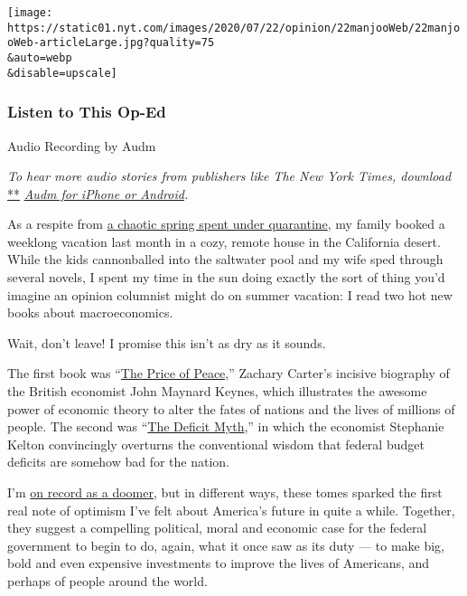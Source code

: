 \texttt{[image: https://static01.nyt.com/images/2020/07/22/opinion/22manjooWeb/22manjooWeb-articleLarge.jpg?quality=75\\\&auto=webp\\\&disable=upscale]}

\hypertarget{listen-to-this-op-ed}{%
\subsubsection{Listen to This Op-Ed}\label{listen-to-this-op-ed}}

Audio Recording by Audm

\emph{To hear more audio stories from publishers like The New York
Times, download}
\href{https://www.audm.com/?utm_source=nytmag\&utm_medium=embed\&utm_campaign=left_behind_draper}{**}
\href{https://www.audm.com/?utm_source=nytopinion\&utm_medium=embed\&utm_campaign=fix_america_spend}{\emph{Audm
for iPhone or Android}}\emph{.}

As a respite from
\href{https://www.nytimes.com/2020/04/22/opinion/coronavirus-parenting-burnout.html}{a
chaotic spring spent under quarantine}, my family booked a weeklong
vacation last month in a cozy, remote house in the California desert.
While the kids cannonballed into the saltwater pool and my wife sped
through several novels, I spent my time in the sun doing exactly the
sort of thing you'd imagine an opinion columnist might do on summer
vacation: I read two hot new books about macroeconomics.

Wait, don't leave! I promise this isn't as dry as it sounds.

The first book was
``\href{https://www.nytimes.com/2020/05/20/books/review-price-of-peace-john-maynard-keynes-zachary-carter.html?auth=login-email\&login=email}{The
Price of Peace,}'' Zachary Carter's incisive biography of the British
economist John Maynard Keynes, which illustrates the awesome power of
economic theory to alter the fates of nations and the lives of millions
of people. The second was
``\href{https://www.nytimes.com/2020/06/09/opinion/us-deficit-coronavirus.html}{The
Deficit Myth},'' in which the economist Stephanie Kelton convincingly
overturns the conventional wisdom that federal budget deficits are
somehow bad for the nation.

I'm
\href{https://www.nytimes.com/2020/05/20/opinion/coronavirus-worst-case.html}{on
record as a doomer}, but in different ways, these tomes sparked the
first real note of optimism I've felt about America's future in quite a
while. Together, they suggest a compelling political, moral and economic
case for the federal government to begin to do, again, what it once saw
as its duty --- to make big, bold and even expensive investments to
improve the lives of Americans, and perhaps of people around the world.


